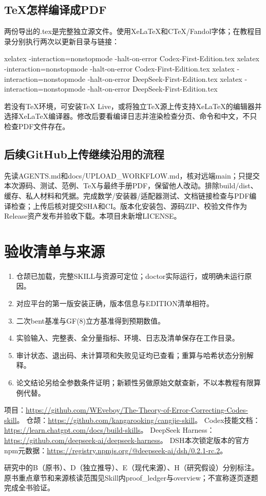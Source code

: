 \documentclass[UTF8,fontset=fandol,zihao=-4]{ctexrep}
\begin{document}
\section{TeX怎样编译成PDF}
两份导出的.tex是完整独立源文件。使用XeLaTeX和CTeX/Fandol字体；在教程目录分别执行两次以更新目录与链接：
\begin{code}
xelatex -interaction=nonstopmode -halt-on-error Codex-First-Edition.tex
xelatex -interaction=nonstopmode -halt-on-error Codex-First-Edition.tex
xelatex -interaction=nonstopmode -halt-on-error DeepSeek-First-Edition.tex
xelatex -interaction=nonstopmode -halt-on-error DeepSeek-First-Edition.tex
\end{code}
若没有TeX环境，可安装TeX Live，或将独立TeX源上传支持XeLaTeX的编辑器并选择XeLaTeX编译器。修改后要看编译日志并渲染检查分页、命令和中文，不只检查PDF文件存在。

\section{后续GitHub上传继续沿用的流程}
先读AGENTS.md和docs/UPLOAD\_WORKFLOW.md，核对远端main；只提交本次源码、测试、范例、TeX与最终手册PDF，保留他人改动。排除build/dist、缓存、私人材料和凭据。完成数学/安装器/适配器测试、文档链接检查与PDF编译检查；上传后核对提交SHA和CI。版本化安装包、源码ZIP、校验文件作为Release资产发布并验收下载。本项目未新增LICENSE。

\chapter{验收清单与来源}
\begin{enumerate}
\item 仓颉已加载，完整SKILL与资源可定位；doctor实际运行，或明确未运行原因。
\item 对应平台的第一版安装正确，版本信息与EDITION清单相符。
\item 二次bent基准与GF(8)立方基准得到预期数值。
\item 实验输入、完整表、全分量指标、环境、日志及清单保存在工作目录。
\item 审计状态、退出码、未计算项和失败见证均已查看；重算与哈希状态分别解释。
\item 论文结论另给全参数条件证明；新颖性另做原始文献查新，不以本教程有限算例代替。
\end{enumerate}

项目：\url{https://github.com/WEveboy/The-Theory-of-Error-Correcting-Codes-skill}。
仓颉：\url{https://github.com/kangarooking/cangjie-skill}。
Codex技能文档：\url{https://learn.chatgpt.com/docs/build-skills}。
DeepSeek Harness：\url{https://github.com/deepseek-ai/deepseek-harness}。
DSH本次锁定版本的官方npm元数据：\url{https://registry.npmjs.org/@deepseek-ai/dsh/0.2.1-rc.2}。

研究中的B（原书）、D（独立推导）、E（现代来源）、H（研究假设）分别标注。原书重点章节和来源核读范围见Skill内proof\_ledger与overview；不宣称逐页逐题完成全书验证。
\end{document}
